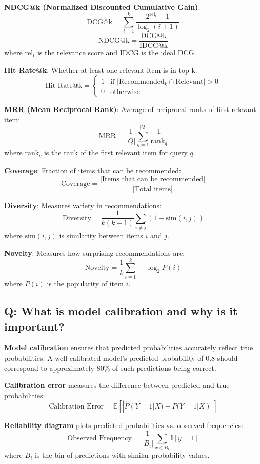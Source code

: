 \textbf{NDCG@k (Normalized Discounted Cumulative Gain)}:
\[
	\text{DCG@k} = \sum_{i=1}^{k} \frac{2^{\text{rel}_i} - 1}{\log_2(i + 1)}
\]
\[
	\text{NDCG@k} = \frac{\text{DCG@k}}{\text{IDCG@k}}
\]
where \(\text{rel}_i\) is the relevance score and IDCG is the ideal DCG.

\textbf{Hit Rate@k}: Whether at least one relevant item is in top-k:
\[
	\text{Hit Rate@k} = \begin{cases}
		1 & \text{if } |\text{Recommended}_k \cap \text{Relevant}| > 0 \\
		0 & \text{otherwise}
	\end{cases}
\]

\textbf{MRR (Mean Reciprocal Rank)}: Average of reciprocal ranks of first relevant item:
\[
	\text{MRR} = \frac{1}{|Q|} \sum_{q=1}^{|Q|} \frac{1}{\text{rank}_q}
\]
where \(\text{rank}_q\) is the rank of the first relevant item for query \(q\).

\textbf{Coverage}: Fraction of items that can be recommended:
\[
	\text{Coverage} = \frac{|\text{Items that can be recommended}|}{|\text{Total items}|}
\]

\textbf{Diversity}: Measures variety in recommendations:
\[
	\text{Diversity} = \frac{1}{k(k-1)} \sum_{i \neq j} (1 - \text{sim}(i, j))
\]
where \(\text{sim}(i, j)\) is similarity between items \(i\) and \(j\).

\textbf{Novelty}: Measures how surprising recommendations are:
\[
	\text{Novelty} = \frac{1}{k} \sum_{i=1}^{k} -\log_2 P(i)
\]
where \(P(i)\) is the popularity of item \(i\).

\subsection*{Q: What is model calibration and why is it important?}
\textbf{Model calibration} ensures that predicted probabilities accurately reflect true probabilities. A well-calibrated model's predicted probability of 0.8 should correspond to approximately 80\% of such predictions being correct.

\textbf{Calibration error} measures the difference between predicted and true probabilities:
\[
	\text{Calibration Error} = \mathbb{E}[|\hat{P}(Y=1|X) - P(Y=1|X)|]
\]

\textbf{Reliability diagram} plots predicted probabilities vs. observed frequencies:
\[
	\text{Observed Frequency} = \frac{1}{|B_i|} \sum_{x \in B_i} \mathbb{I}[y = 1]
\]
where \(B_i\) is the bin of predictions with similar probability values.


